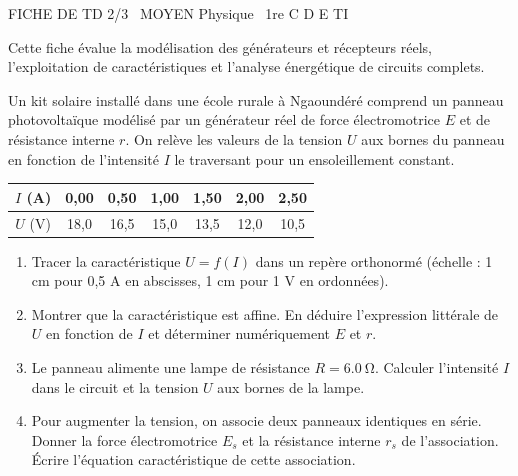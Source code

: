 \documentclass[11pt]{article}
\begin{document}
\begin{tcolorbox}[enhanced,colback=popink,colframe=popink,arc=10pt,boxrule=0pt,left=12pt,right=12pt,top=9pt,bottom=9pt]
{\color{white}\popxbold\small FICHE DE TD 2/3 \textbullet\ MOYEN \hfill Physique \textbullet\ 1re C D E TI\par}
\end{tcolorbox}
\vspace{4pt}
Cette fiche évalue la modélisation des générateurs et récepteurs réels, l'exploitation de caractéristiques et l'analyse énergétique de circuits complets.

\begin{exercice}
Un kit solaire installé dans une école rurale à Ngaoundéré comprend un panneau photovoltaïque modélisé par un générateur réel de force électromotrice $E$ et de résistance interne $r$. On relève les valeurs de la tension $U$ aux bornes du panneau en fonction de l'intensité $I$ le traversant pour un ensoleillement constant.
\begin{center}
\begin{tabular}{|c|c|c|c|c|c|c|}
\hline
$I$ (\si{\ampere}) & 0,00 & 0,50 & 1,00 & 1,50 & 2,00 & 2,50 \\
\hline
$U$ (\si{\volt}) & 18,0 & 16,5 & 15,0 & 13,5 & 12,0 & 10,5 \\
\hline
\end{tabular}
\end{center}
\begin{enumerate}
    \item Tracer la caractéristique $U = f(I)$ dans un repère orthonormé (échelle : 1 cm pour 0,5 A en abscisses, 1 cm pour 1 V en ordonnées).
    \item Montrer que la caractéristique est affine. En déduire l'expression littérale de $U$ en fonction de $I$ et déterminer numériquement $E$ et $r$.
    \item Le panneau alimente une lampe de résistance $R = \SI{6,0}{\ohm}$. Calculer l'intensité $I$ dans le circuit et la tension $U$ aux bornes de la lampe.
    \item Pour augmenter la tension, on associe deux panneaux identiques en série. Donner la force électromotrice $E_s$ et la résistance interne $r_s$ de l'association. Écrire l'équation caractéristique de cette association.
\end{enumerate}
\end{exercice}
\end{document}
